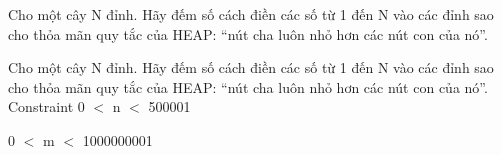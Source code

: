 Cho một cây N đỉnh. Hãy đếm số cách điền các số từ 1 đến N vào các đỉnh sao cho thỏa mãn quy tắc của HEAP: “nút cha luôn nhỏ hơn các nút con của nó”.

Cho một cây N đỉnh. Hãy đếm số cách điền các số từ 1 đến N vào các đỉnh sao cho thỏa mãn quy tắc của HEAP: “nút cha luôn nhỏ hơn các nút con của nó”.
Constraint
0 $<$ n $<$ 500001

0 $<$ m $<$ 1000000001